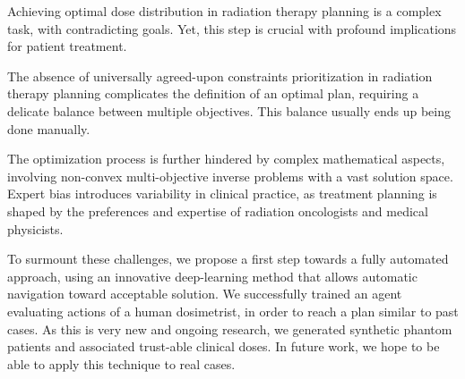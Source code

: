 Achieving optimal dose distribution in radiation therapy planning is a complex task, with contradicting goals.
Yet, this step is crucial with profound implications for patient treatment.

The absence of universally agreed-upon constraints prioritization in radiation therapy planning complicates the definition of an optimal plan, requiring a delicate balance between multiple objectives.
This balance usually ends up being done manually.

The optimization process is further hindered by complex mathematical aspects, involving non-convex multi-objective inverse problems with a vast solution space.
Expert bias introduces variability in clinical practice, as treatment planning is shaped by the preferences and expertise of radiation oncologists and medical physicists.

To surmount these challenges, we propose a first step towards a fully automated approach, using an innovative deep-learning method that allows automatic navigation toward acceptable solution.
We successfully trained an agent evaluating actions of a human dosimetrist, in order to reach a plan similar to past cases.
As this is very new and ongoing research, we generated synthetic phantom patients and associated trust-able clinical doses.
In future work, we hope to be able to apply this technique to real cases.